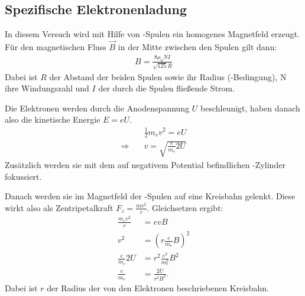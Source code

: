\subsection{Spezifische Elektronenladung}
In diesem Versuch wird mit Hilfe von -Spulen ein homogenes Magnetfeld erzeugt. Für den magnetischen Fluss $\vec B$ in der Mitte zwischen den Spulen gilt dann: \citep[S.\,91]{Demtroeder-Exp2}
\begin{align}
  B = \frac{8 \mu_0 N I}{\sqrt{125} R}
  \label{eq:B-Feld}
\end{align}
Dabei ist $R$ der Abstand der beiden Spulen sowie ihr Radius (-Bedingung), N ihre Windungszahl und $I$ der durch die Spulen fließende Strom.

Die Elektronen werden durch die Anodenspannung $U$ beschleunigt, haben danach also die kinetische Energie $E = eU$.
\begin{align*}
  & \frac{1}{2} m_e v^2 = e U \\ 
 \Rightarrow \quad & v = \sqrt{\frac{e}{m_e} 2 U}
\end{align*}
Zusätzlich werden sie mit dem auf negativem Potential befindlichen -Zylinder fokussiert.

Danach werden sie im Magnetfeld der -Spulen auf eine Kreisbahn gelenkt. Diese wirkt also als Zentripetalkraft $F_z = \frac{m v^2}{r}$. Gleichsetzen ergibt:
\begin{align}
  \frac{m_e v^2}{r} &= e v B \nonumber\\
  v^2 &= \left(r \frac{e}{m_e} B\right)^2 \nonumber\\
  \frac{e}{m_e} 2 U &= r^2 \frac{e^2}{m_e^2}B^2 \nonumber\\
  \frac{e}{m_e} &= \frac{2U}{r^2 B^2}. 
  \label{eq:SpezLad}
\end{align}
Dabei ist $r$ der Radius der von den Elektronen beschriebenen Kreisbahn.
